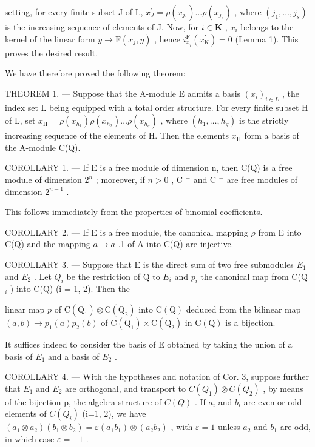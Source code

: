 setting, for every finite subset J of L, \(x_{J}^{\prime}=\rho(x_{j_{1}})\ldots\rho(x_{j_{s}})\) , where \((j_{1},\ldots,j_{s})\) is the increasing sequence of elements of J. Now, for \(i\in\mathbf{K}\) , \(x_{i}\) belongs to the kernel of the linear form \(y\to\mathrm{F}(x_{j},y)\) , hence \(i_{x_{j}}^{\mathrm{F}}(x_{\mathrm{K}}^{\prime})=0\) (Lemma 1). This proves the desired result.

We have therefore proved the following theorem:

THEOREM 1. --- Suppose that the A-module E admits a basis \((x_{i})_{i\in L}\) , the index set L being equipped with a total order structure. For every finite subset H of L, set \(x_{\mathrm{H}} = \rho(x_{h_1})\rho(x_{h_2})\ldots \rho(x_{h_q})\) , where \((h_1,\ldots,h_q)\) is the strictly increasing sequence of the elements of H. Then the elements \(x_{\mathrm{H}}\) form a basis of the A-module C(Q).

COROLLARY 1. --- If E is a free module of dimension n, then C(Q) is a free module of dimension \(2^{n}\) ; moreover, if \(n > 0\) , C \(^{+}\) and C \(^{-}\) are free modules of dimension \(2^{n-1}\) .

This follows immediately from the properties of binomial coefficients.

COROLLARY 2. --- If E is a free module, the canonical mapping \(\rho\) from E into C(Q) and the mapping \(a \to a\) .1 of A into C(Q) are injective.

COROLLARY 3. --- Suppose that E is the direct sum of two free submodules \(E_{1}\) and \(E_{2}\) . Let \(Q_{i}\) be the restriction of Q to \(E_{i}\) and \(p_{i}\) the canonical map from C(Q \(_{i}\) ) into C(Q) (i = 1, 2). Then the

linear map \(p\) of \(\mathrm{C(Q_{1})\otimes C(Q_{2})}\) into \(\mathrm{C(Q)}\) deduced from the bilinear map \((a,b)\to p_{1}(a)p_{2}(b)\) of \(\mathrm{C(Q_{1})\times C(Q_{2})}\) in \(\mathrm{C(Q)}\) is a bijection.

It suffices indeed to consider the basis of E obtained by taking the union of a basis of \(E_{1}\) and a basis of \(E_{2}\) .

COROLLARY 4. --- With the hypotheses and notation of Cor. 3, suppose further that \(E_{1}\) and \(E_{2}\) are orthogonal, and transport to \(C(Q_{1})\otimes C(Q_{2})\) , by means of the bijection p, the algebra structure of \(C(Q)\) . If \(a_{i}\) and \(b_{i}\) are even or odd elements of \(C(Q_{i})\) (i=1, 2), we have \((a_{1}\otimes a_{2})(b_{1}\otimes b_{2})=\varepsilon(a_{1}b_{1})\otimes(a_{2}b_{2})\) , with \(\varepsilon=1\) unless \(a_{2}\) and \(b_{1}\) are odd, in which case \(\varepsilon=-1\) .

